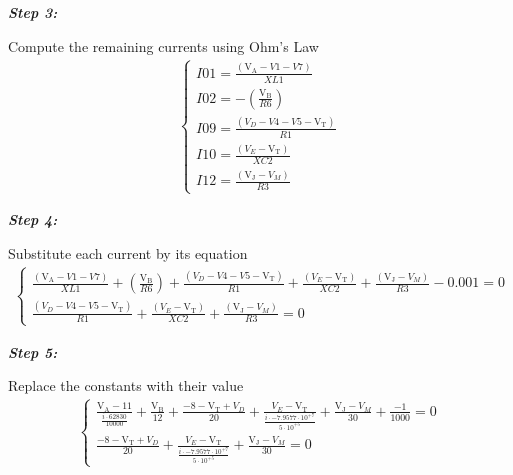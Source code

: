 \documentclass[a4paper]{article}
\begin{document}
\begin{small}\textbf{\textit{Step 3:}}\end{small}  Compute the remaining currents using Ohm's Law
\begin{gather*}
\begin{cases}I01 = \frac{\left(\mathrm{V_{A}}- V1 -  V7\right)}{ XL1} \\[0.7em] I02 = -\left(\frac{\mathrm{V_{B}}}{ R6}\right) \\[0.7em] I09 = \frac{\left( V_{D}- V4 -  V5 - \mathrm{V_{T}}\right)}{ R1} \\[0.7em] I10 = \frac{\left( V_{E}-\mathrm{V_{T}}\right)}{ XC2} \\[0.7em] I12 = \frac{\left(\mathrm{V_{J}}- V_{M}\right)}{ R3}\end{cases}
\end{gather*}

\begin{small}\textbf{\textit{Step 4:}}\end{small}  Substitute each current by its equation
\begin{gather*}
\begin{cases}\frac{\left(\mathrm{V_{A}}- V1- V7\right)}{ XL1}+\left(\frac{\mathrm{V_{B}}}{ R6}\right)+\frac{\left( V_{D}- V4- V5-\mathrm{V_{T}}\right)}{ R1}+\frac{\left( V_{E}-\mathrm{V_{T}}\right)}{ XC2}+\frac{\left(\mathrm{V_{J}}- V_{M}\right)}{ R3}-0.001 = 0 \\[0.7em] \frac{\left( V_{D}- V4- V5-\mathrm{V_{T}}\right)}{ R1}+\frac{\left( V_{E}-\mathrm{V_{T}}\right)}{ XC2}+\frac{\left(\mathrm{V_{J}}- V_{M}\right)}{ R3} = 0\end{cases}
\end{gather*}

\begin{small}\textbf{\textit{Step 5:}}\end{small}  Replace the constants with their value
\begin{gather*}
\begin{cases}\frac{\mathrm{V_{A}}-11}{\frac{ i\cdot62830}{10000}}+\frac{\mathrm{V_{B}}}{12}+\frac{-8-\mathrm{V_{T}}+ V_{D}}{20}+\frac{ V_{E}-\mathrm{V_{T}}}{\frac{ i\cdot-7.9577\cdot10^{+7}}{5\cdot10^{+5}}}+\frac{\mathrm{V_{J}}- V_{M}}{30}+\frac{-1}{1000} = 0 \\[0.7em] \frac{-8-\mathrm{V_{T}}+ V_{D}}{20}+\frac{ V_{E}-\mathrm{V_{T}}}{\frac{ i\cdot-7.9577\cdot10^{+7}}{5\cdot10^{+5}}}+\frac{\mathrm{V_{J}}- V_{M}}{30} = 0\end{cases}
\end{gather*}
\end{document}

